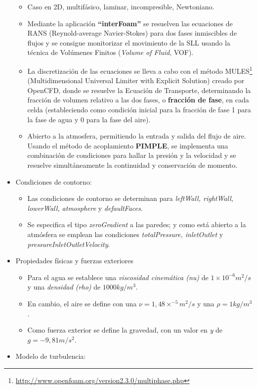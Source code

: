 \begin{itemize}
  \begin{itemize}
  \item
    Caso en 2D, multifásico, laminar, incompresible, Newtoniano. \\
  \item
    Mediante la aplicación \textbf{``interFoam''} se resuelven las
    ecuaciones de RANS (Reynold-average Navier-Stokes) para dos fases
    inmiscibles de flujos y se consigue monitorizar el movimiento de la
    SLL usando la técnica de Volúmenes Finitos (\emph{Volume of Fluid},
    VOF).
  \item
    La discretización de las ecuaciones se lleva a cabo con el método MULES\footnote{\url{http://www.openfoam.org/version2.3.0/multiphase.php}}
    (Multidimensional Universal Limiter with Explicit Solution) creado
    por OpenCFD, donde se resuelve la Ecuación de Transporte,
    determinando la fracción de volumen relativo a las dos fases, o
    \textbf{fracción de fase}, en cada celda (estableciendo como
    condición inicial para la fracción de fase 1 para la fase de agua y
    0 para la fase del aire).
  \item
    Abierto a la atmosfera, permitiendo la entrada y salida del flujo de
    aire. Usando el método de acoplamiento \textbf{PIMPLE}, se
    implementa una combinación de condiciones para hallar la presión y
    la velocidad y se resuelve simultáneamente la continuidad y
    conservación de momento.
  \end{itemize}
\item
  Condiciones de contorno:

  \begin{itemize}
  \item
    Las condiciones de contorno se determinan para \emph{leftWall,
    rightWall, lowerWall, atmosphere} y \emph{defaultFaces}.
  \item
    Se especifica el tipo \emph{zeroGradient} a las paredes; y como está
    abierto a la atmósfera se emplean las condiciones
    \emph{totalPressure, inletOutlet} y
    \emph{pressureInletOutletVelocity}.
  \end{itemize}
\item
  Propiedades físicas y fuerzas exteriores

  \begin{itemize}
  \item
    Para el agua se establece una \emph{viscosidad cinemática (nu)} de
    \(1\times10^{-6} m^2/s\) y una \emph{densidad (rho)} de
    \(1000 kg/m^3\).
  \item
    En cambio, el aire se define con una \(\nu=1,48 \times ^{-5} m^2/s\)
    y una \(\rho=1kg/m^3\).
  \item
    Como fuerza exterior se define la gravedad, con un valor en \emph{y}
    de \(g=-9,81m/s^2\).
  \end{itemize}
\item
  Modelo de turbulencia:


\end{itemize}
